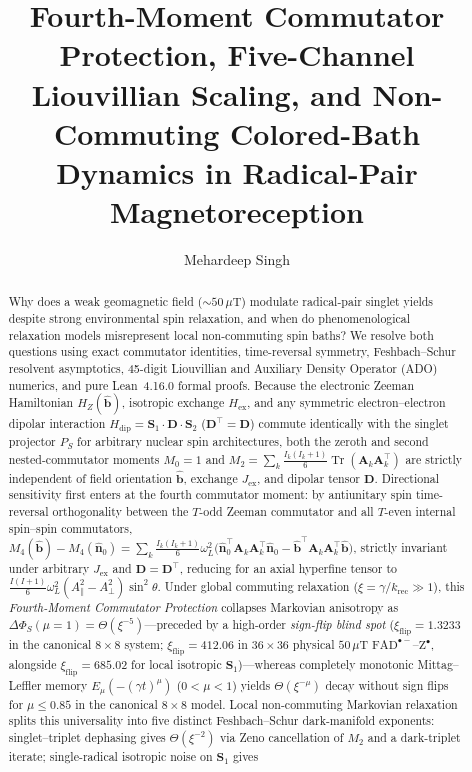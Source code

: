 \documentclass[twocolumn,10pt,amsmath,amssymb,floatfix]{revtex4-2}
\theoremstyle{plain}
\theoremstyle{definition}
\newcommand{\Tr}{\operatorname{Tr}}
\newcommand{\PS}{P_S}
\newcommand{\HZ}{H_Z}
\newcommand{\Hex}{H_{\mathrm{ex}}}
\newcommand{\Hdip}{H_{\mathrm{dip}}}
\newcommand{\DeltaPhi}{\Delta\Phi_S}
\newcommand{\xiflip}{\xi_{\mathrm{flip}}}
\begin{document}
\setlength{\dbltextfloatsep}{10pt plus 2pt minus 2pt}
\setlength{\dblfloatsep}{8pt plus 2pt minus 2pt}
\setlength{\emergencystretch}{1.8em}

\title{Fourth-Moment Commutator Protection, Five-Channel Liouvillian Scaling, and Non-Commuting Colored-Bath Dynamics in Radical-Pair Magnetoreception}

\author{Mehardeep Singh}

\begin{abstract}
Why does a weak geomagnetic field ($\sim 50\,\mu\text{T}$) modulate radical-pair singlet yields despite strong environmental spin relaxation, and when do phenomenological relaxation models misrepresent local non-commuting spin baths? We resolve both questions using exact commutator identities, time-reversal symmetry, Feshbach--Schur resolvent asymptotics, 45-digit Liouvillian and Auxiliary Density Operator (ADO) numerics, and pure Lean~4.16.0 formal proofs. Because the electronic Zeeman Hamiltonian $\HZ(\hat{\mathbf{b}})$, isotropic exchange $\Hex$, and any symmetric electron--electron dipolar interaction $\Hdip = \mathbf{S}_1\cdot\mathbf{D}\cdot\mathbf{S}_2$ ($\mathbf{D}^\top = \mathbf{D}$) commute identically with the singlet projector $\PS$ for arbitrary nuclear spin architectures, both the zeroth and second nested-commutator moments $M_0 = 1$ and $M_2 = \sum_k \frac{I_k(I_k+1)}{6}\Tr(\mathbf{A}_k\mathbf{A}_k^\top)$ are strictly independent of field orientation $\hat{\mathbf{b}}$, exchange $J_{\mathrm{ex}}$, and dipolar tensor $\mathbf{D}$. Directional sensitivity first enters at the fourth commutator moment: by antiunitary spin time-reversal orthogonality between the $T$-odd Zeeman commutator and all $T$-even internal spin--spin commutators, $M_4(\hat{\mathbf{b}}) - M_4(\hat{\mathbf{n}}_0) = \sum_k \frac{I_k(I_k+1)}{6}\omega_L^2 \bigl(\hat{\mathbf{n}}_0^\top\mathbf{A}_k\mathbf{A}_k^\top\hat{\mathbf{n}}_0 - \hat{\mathbf{b}}^\top\mathbf{A}_k\mathbf{A}_k^\top\hat{\mathbf{b}}\bigr)$, strictly invariant under arbitrary $J_{\mathrm{ex}}$ and $\mathbf{D} = \mathbf{D}^\top$, reducing for an axial hyperfine tensor to $\frac{I(I+1)}{6}\omega_L^2(A_\parallel^2 - A_\perp^2)\sin^2\theta$. Under global commuting relaxation ($\xi = \gamma/k_{\mathrm{rec}} \gg 1$), this \emph{Fourth-Moment Commutator Protection} collapses Markovian anisotropy as $\DeltaPhi(\mu=1) = \Theta(\xi^{-5})$---preceded by a high-order \emph{sign-flip blind spot} ($\xiflip = 1.3233$ in the canonical $8\times 8$ system; $\xiflip = 412.06$ in $36\times 36$ physical $50\,\mu\text{T}$ $\mathrm{FAD}^{\bullet-}\text{--}\mathrm{Z}^{\bullet}$, alongside $\xiflip = 685.02$ for local isotropic $\mathbf{S}_1$)---whereas completely monotonic Mittag--Leffler memory $E_\mu(-(\gamma t)^\mu)$ ($0<\mu<1$) yields $\Theta(\xi^{-\mu})$ decay without sign flips for $\mu \le 0.85$ in the canonical $8\times 8$ model. Local non-commuting Markovian relaxation splits this universality into five distinct Feshbach--Schur dark-manifold exponents: singlet--triplet dephasing gives $\Theta(\xi^{-2})$ via Zeno cancellation of $M_2$ and a dark-triplet iterate; single-radical isotropic noise on $\mathbf{S}_1$ gives 
\end{abstract}
\end{document}
